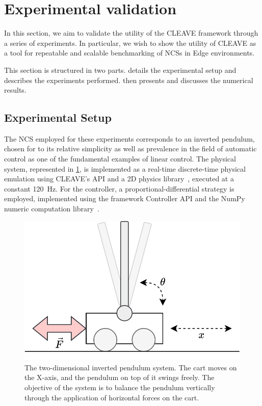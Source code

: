 \section{Experimental validation}\label{sec:experiments}


In this section, we aim to validate the utility of the CLEAVE framework through a series of experiments.
In particular, we wish to show the utility of CLEAVE as a tool for repeatable and scalable benchmarking of \acp{NCS} in Edge environments.


This section is structured in two parts.
 details the experimental setup and describes the experiments performed.
 then presents and discusses the numerical results.

\subsection{Experimental Setup}\label{ssec:expsetup}

The \acl{NCS} employed for these experiments corresponds to an inverted pendulum, chosen for to its relative simplicity as well as prevalence in the field of automatic control as one of the fundamental examples of linear control.
The physical system, represented in \cref{fig:invpend}, is implemented as a real-time discrete-time physical emulation using CLEAVE's API and a 2D physics library~\autocite{chipmunk2d,pymunk}, executed at a constant \SI{120}{\hertz}.
For the controller, a proportional-differential strategy is employed, implemented using the framework Controller API and the NumPy numeric computation library~\autocite{harris2020array}.

\begin{figure}
    \centering
    \includegraphics[width=.95\columnwidth]{images/inverted_pendulum.png}
    \caption{
        The two-dimensional inverted pendulum system.
        The cart moves on the X-axis, and the pendulum on top of it swings freely.
        The objective of the system is to balance the pendulum vertically through the application of horizontal forces on the cart.
    }\label{fig:invpend}
\end{figure}

